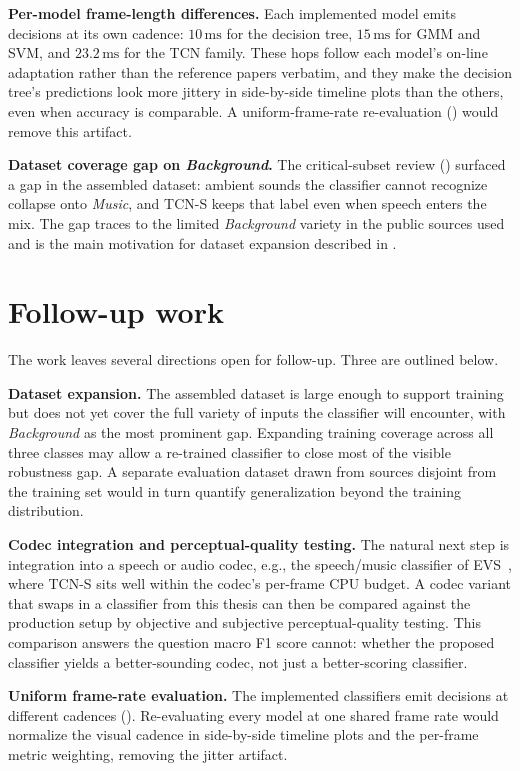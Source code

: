\textbf{Per-model frame-length differences.}
Each implemented model emits decisions at its own cadence: $10\,\text{ms}$ for the decision tree, $15\,\text{ms}$ for GMM and SVM, and $23.2\,\text{ms}$ for the TCN family.
These hops follow each model's on-line adaptation rather than the reference papers verbatim, and they make the decision tree's predictions look more jittery in side-by-side timeline plots than the others, even when accuracy is comparable.
A uniform-frame-rate re-evaluation () would remove this artifact.

\textbf{Dataset coverage gap on \emph{Background}.}
The critical-subset review () surfaced a gap in the assembled dataset: ambient sounds the classifier cannot recognize collapse onto \emph{Music}, and TCN-S keeps that label even when speech enters the mix.
The gap traces to the limited \emph{Background} variety in the public sources used and is the main motivation for dataset expansion described in .


\section{Follow-up work}
\label{sec:conclusion_future}

The work leaves several directions open for follow-up. Three are outlined below.

\textbf{Dataset expansion.}
The assembled dataset is large enough to support training but does not yet cover the full variety of inputs the classifier will encounter, with \emph{Background} as the most prominent gap.
Expanding training coverage across all three classes may allow a re-trained classifier to close most of the visible robustness gap.
A separate evaluation dataset drawn from sources disjoint from the training set would in turn quantify generalization beyond the training distribution.

\textbf{Codec integration and perceptual-quality testing.}
The natural next step is integration into a speech or audio codec, e.g., the speech/music classifier of EVS~\cite{dietz2015evs}, where TCN-S sits well within the codec's per-frame CPU budget.
A codec variant that swaps in a classifier from this thesis can then be compared against the production setup by objective and subjective perceptual-quality testing.
This comparison answers the question macro F1 score cannot: whether the proposed classifier yields a better-sounding codec, not just a better-scoring classifier.

\textbf{Uniform frame-rate evaluation.}
The implemented classifiers emit decisions at different cadences ().
Re-evaluating every model at one shared frame rate would normalize the visual cadence in side-by-side timeline plots and the per-frame metric weighting, removing the jitter artifact.

